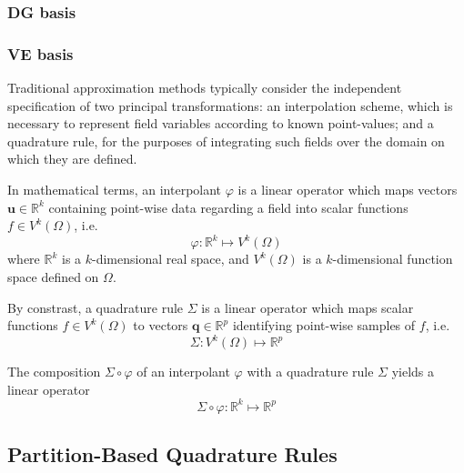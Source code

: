 		\subsubsection*{DG basis}
		\subsubsection*{VE basis}

Traditional approximation methods typically consider the independent specification of two principal transformations: an interpolation scheme, which is necessary to represent field variables according to known point-values; and a quadrature rule, for the purposes of integrating such fields over the domain on which they are defined.

In mathematical terms, an interpolant $\varphi$ is a linear operator which maps vectors $\mathbf{u} \in \mathbb{R}^k$ containing point-wise data regarding a field into scalar functions $f \in V^k (\Omega)$, i.e.
\begin{equation}
  \varphi \colon \mathbb{R}^k \mapsto V^k (\Omega)
\end{equation}
where $\mathbb{R}^k$ is a $k$-dimensional real space, and $V^k (\Omega)$ is a $k$-dimensional function space defined on $\Omega$.

By constrast, a quadrature rule $\Sigma$ is a linear operator which maps scalar functions $f \in V^k (\Omega)$ to vectors $\mathbf{q} \in \mathbb{R}^p$ identifying point-wise samples of $f$, i.e.
\begin{equation}
  \Sigma \colon V^k (\Omega) \mapsto \mathbb{R}^p
\end{equation}

The composition $\Sigma \circ \varphi$ of an interpolant $\varphi$ with a quadrature rule $\Sigma$ yields a linear operator
\begin{equation}
  \Sigma \circ \varphi \colon \mathbb{R}^k \mapsto \mathbb{R}^p
\end{equation}

\subsection{Partition-Based Quadrature Rules}

